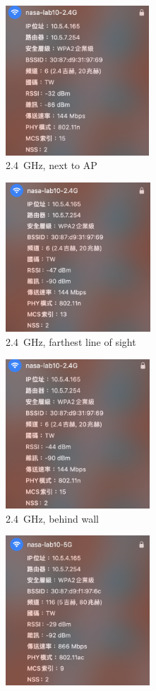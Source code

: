 \documentclass[12pt, a4paper]{article}
\begin{document}
  \begin{figure}[H]
    \begin{subfigure}{0.32\textwidth}
      \includegraphics[height=5.6cm]{2.4G_closest.png}
      \caption{2.4~GHz, next to AP}
    \end{subfigure}
    \hfill
    \begin{subfigure}{0.32\textwidth}
      \includegraphics[height=5.6cm]{2.4G_farthest.png}
      \caption{2.4~GHz, farthest line of sight}
    \end{subfigure}
    \hfill
    \begin{subfigure}{0.32\textwidth}
      \includegraphics[height=5.6cm]{2.4G_wall.png}
      \caption{2.4~GHz, behind wall}
    \end{subfigure}
    \begin{subfigure}{0.32\textwidth}
      \includegraphics[height=5.6cm]{5G_closest.png}

\end{subfigure}
\end{figure}
\end{document}
